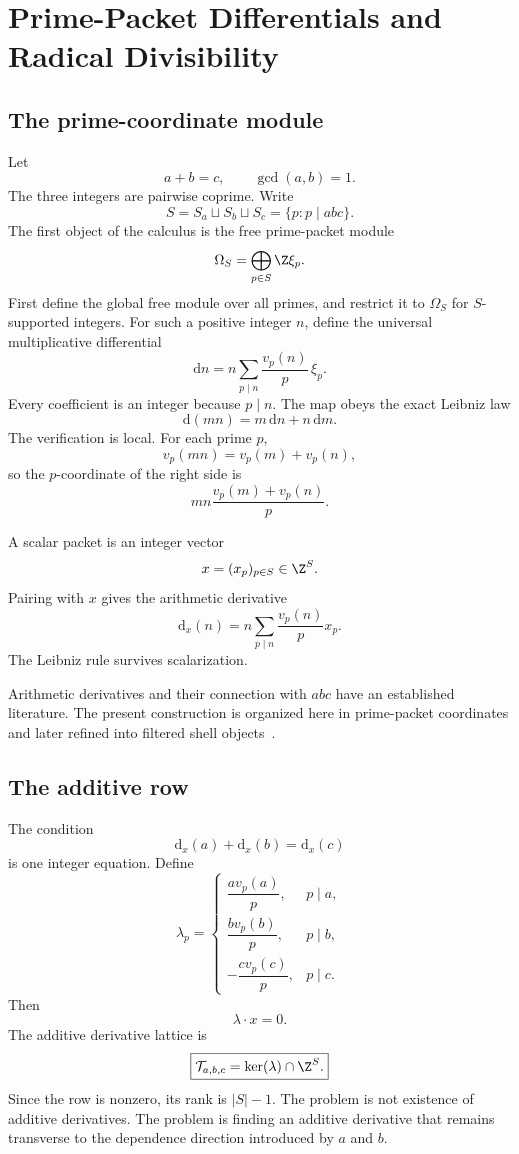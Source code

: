 \clearpage
\section{Prime-Packet Differentials and Radical Divisibility}

\subsection{The prime-coordinate module}
Let
\[
 a+b=c,
 \qquad
 \gcd(a,b)=1.
\]
The three integers are pairwise coprime. Write
\[
 S=S_a\sqcup S_b\sqcup S_c
 =\{p:p\mid abc\}.
\]
The first object of the calculus is the free prime-packet module
\[
 \Omega_S=\bigoplus_{p\in S}\Z\xi_p.
\]
First define the global free module over all primes, and restrict it to $\Omega_S$ for $S$-supported integers. For such a positive integer $n$, define the universal multiplicative differential
\[
 \boxed{
 \mathrm dn
 =
 n\sum_{p\mid n}\frac{v_p(n)}p\,\xi_p.
 }
\]
Every coefficient is an integer because $p\mid n$. The map obeys the exact Leibniz law
\[
 \mathrm d(mn)=m\,\mathrm dn+n\,\mathrm dm.
\]
The verification is local. For each prime $p$,
\[
 v_p(mn)=v_p(m)+v_p(n),
\]
so the $p$-coordinate of the right side is
\[
 mn\frac{v_p(m)+v_p(n)}p.
\]

A scalar packet is an integer vector
\[
 x=(x_p)_{p\in S}\in\Z^S.
\]
Pairing with $x$ gives the arithmetic derivative
\[
 \boxed{
 \mathrm d_x(n)
 =
 n\sum_{p\mid n}\frac{v_p(n)}p x_p.
 }
\]
The Leibniz rule survives scalarization.

Arithmetic derivatives and their connection with $abc$ have an established literature. The present construction is organized here in prime-packet coordinates and later refined into filtered shell objects~\cite{PastenDerivatives,VojtaABC}.

\subsection{The additive row}
The condition
\[
 \mathrm d_x(a)+\mathrm d_x(b)=\mathrm d_x(c)
\]
is one integer equation. Define
\[
 \lambda_p=
 \begin{cases}
 \dfrac{a v_p(a)}p,&p\mid a,\\[6pt]
 \dfrac{b v_p(b)}p,&p\mid b,\\[6pt]
 -\dfrac{c v_p(c)}p,&p\mid c.
 \end{cases}
\]
Then
\[
 \boxed{\lambda\cdot x=0.}
\]
The additive derivative lattice is
\[
 \boxed{
 \mathcal T_{a,b,c}
 =
 \ker(\lambda)\cap\Z^S.
 }
\]
Since the row is nonzero, its rank is $|S|-1$. The problem is not existence of additive derivatives. The problem is finding an additive derivative that remains transverse to the dependence direction introduced by $a$ and $b$.

